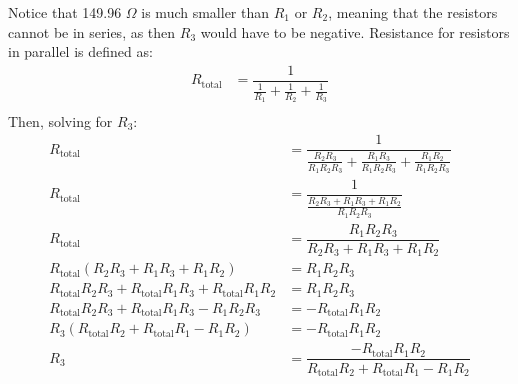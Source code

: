 \documentclass [12pt, letterpaper, twoside] {article}
\begin{document}
Notice that 149.96 \(\Omega\) is much smaller than \(R_{1}\) or \(R_{2}\), meaning that the resistors cannot be in series, as then \(R_{3}\) would have to be negative. Resistance for resistors in parallel is defined as:
\begin{equation}
  \begin{split}
    R_{\text{total}} &= \dfrac{1}{\tfrac{1}{R_{1}} + \tfrac{1}{R_{2}} + \tfrac{1}{R_{3}}} \\
  \end{split}
\end{equation}
Then, solving for \(R_{3}\):
\begin{equation*}
  \begin{split}
    R_{\text{total}} &= \dfrac{1}{\tfrac{R_{2}R_{3}}{R_{1}R_{2}R_{3}} + \tfrac{R_{1}R_{3}}{R_{1}R_{2}R_{3}} + \tfrac{R_{1}R_{2}}{R_{1}R_{2}R_{3}}} \\
    R_{\text{total}} &= \dfrac{1}{\tfrac{R_{2}R_{3} + R_{1}R_{3} + R_{1}R_{2}}{R_{1}R_{2}R_{3}}} \\
    R_{\text{total}} &= \dfrac{R_{1}R_{2}R_{3}}{R_{2}R_{3} + R_{1}R_{3} + R_{1}R_{2}} \\
    R_{\text{total}}(R_{2}R_{3} + R_{1}R_{3} + R_{1}R_{2}) &= R_{1}R_{2}R_{3} \\
    R_{\text{total}}R_{2}R_{3} + R_{\text{total}}R_{1}R_{3} + R_{\text{total}}R_{1}R_{2} &= R_{1}R_{2}R_{3} \\
    R_{\text{total}}R_{2}R_{3} + R_{\text{total}}R_{1}R_{3} - R_{1}R_{2}R_{3} &= -R_{\text{total}}R_{1}R_{2} \\
    R_{3}(R_{\text{total}}R_{2} + R_{\text{total}}R_{1} - R_{1}R_{2}) &= -R_{\text{total}}R_{1}R_{2} \\
    R_{3} &= \dfrac{-R_{\text{total}}R_{1}R_{2}}{R_{\text{total}}R_{2} + R_{\text{total}}R_{1} -R_{1}R_{2}} \\
  \end{split}
\end{equation*}
\end{document}
